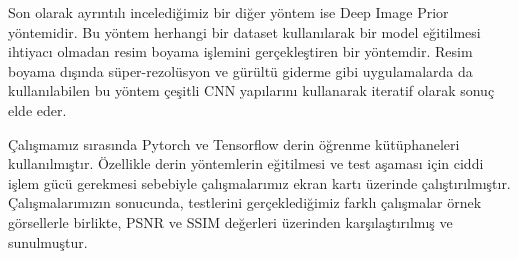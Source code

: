 Son olarak ayrıntılı incelediğimiz bir diğer yöntem ise Deep Image Prior yöntemidir. Bu yöntem herhangi bir dataset kullanılarak bir model eğitilmesi ihtiyacı olmadan resim boyama işlemini gerçekleştiren bir yöntemdir. Resim boyama dışında süper-rezolüsyon ve gürültü giderme gibi uygulamalarda da kullanılabilen bu yöntem çeşitli CNN yapılarını kullanarak iteratif olarak sonuç elde eder. 

Çalışmamız sırasında Pytorch ve Tensorflow derin öğrenme kütüphaneleri kullanılmıştır. Özellikle derin yöntemlerin eğitilmesi ve test aşaması için ciddi işlem gücü gerekmesi sebebiyle çalışmalarımız ekran kartı üzerinde çalıştırılmıştır. Çalışmalarımızın sonucunda, testlerini gerçeklediğimiz farklı çalışmalar örnek görsellerle birlikte, PSNR ve SSIM değerleri üzerinden karşılaştırılmış ve sunulmuştur.